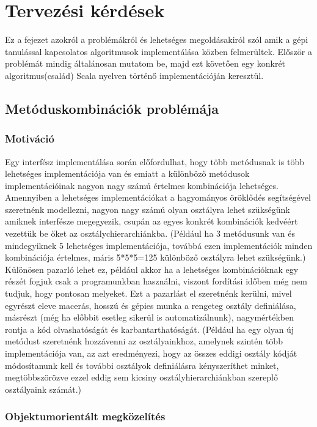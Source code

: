 \newpage
\section{Tervezési kérdések}

Ez a fejezet azokról a problémákról és lehetséges megoldásakiról szól amik a gépi tanulással kapcsolatos algoritmusok
implementálása közben felmerültek. Először a problémát mindig általánosan mutatom be, majd ezt követően egy konkrét
algoritmus(család) Scala nyelven történő implementációján keresztül.

\subsection{Metóduskombinációk problémája}

\subsubsection{Motiváció}

Egy interfész implementálása során előfordulhat, hogy több metódusnak is több lehetséges implementációja van és
emiatt a különböző metódusok implementációinak nagyon nagy számú értelmes kombinációja lehetséges. Amennyiben a
lehetséges implementációkat a hagyományos öröklődés segítségével szeretnénk modellezni, nagyon nagy számú olyan
osztályra lehet szükségünk amiknek interfésze megegyezik, csupán az egyes konkrét kombinációk kedvéért vezettük
be őket az osztálychierarchiánkba. (Például ha 3 metódusunk van és mindegyiknek 5 lehetséges implementációja, továbbá ezen implementációk
minden kombinációja értelmes, máris 5*5*5=125 különböző osztályra lehet szükségünk.) Különösen pazarló lehet ez,
például akkor ha a lehetséges kombinációknak egy részét fogjuk csak a programunkban használni, viszont fordítási
időben még nem tudjuk, hogy pontosan melyeket. Ezt a pazarlást el szeretnénk kerülni, mivel egyrészt eleve macerás,
hosszú és gépies munka a rengeteg osztály definiálása, másrészt (még ha előbbit esetleg sikerül is automatizálnunk),
nagymértékben rontja a kód olvashatóságát és karbantarthatóságát. (Például ha egy olyan új metódust szeretnénk
hozzávenni az osztályainkhoz, amelynek szintén több implementációja van, az azt eredményezi, hogy az összes eddigi
osztály kódját módosítanunk kell és további osztályok definiálásra kényszeríthet minket, megtöbbszörözve ezzel eddig
sem kicsiny osztályhierarchiánkban szereplő osztályaink számát.)

\subsubsection{Objektumorientált megközelítés}

